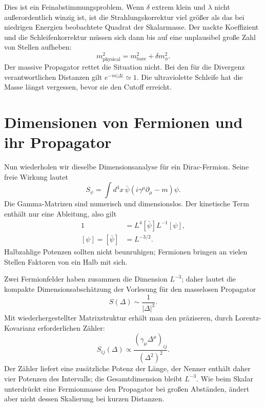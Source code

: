 Dies ist ein Feinabstimmungsproblem. Wenn \(\delta\) extrem klein und \(\lambda\) nicht außerordentlich winzig ist, ist die Strahlungskorrektur viel größer als das bei niedrigen Energien beobachtete Quadrat der Skalarmasse. Der nackte Koeffizient und die Schleifenkorrektur müssen sich dann bis auf eine unplausibel große Zahl von Stellen aufheben:
\begin{equation}
m_{\mathrm{physical}}^2
=m_{\mathrm{bare}}^2+\delta m_\phi^2.
\end{equation}
Der massive Propagator rettet die Situation nicht. Bei den für die Divergenz verantwortlichen Distanzen gilt \(e^{-m|\Delta|}\simeq1\). Die ultraviolette Schleife hat die Masse längst vergessen, bevor sie den Cutoff erreicht.

\section{Dimensionen von Fermionen und ihr Propagator}

Nun wiederholen wir dieselbe Dimensionsanalyse für ein Dirac-Fermion. Seine freie Wirkung lautet
\begin{equation}
S_\psi=\int d^4x\,
\bar\psi\left(i\gamma^\mu\partial_\mu-m\right)\psi.
\end{equation}
Die Gamma-Matrizen sind numerisch und dimensionslos. Der kinetische Term enthält nur eine Ableitung, also gilt
\begin{align}
1
&=L^4[\bar\psi]L^{-1}[\psi],\\
[\psi]=[\bar\psi]&=L^{-3/2}.
\end{align}
Halbzahlige Potenzen sollten nicht beunruhigen; Fermionen bringen an vielen Stellen Faktoren von ein Halb mit sich.

\begin{classroomqa}
\end{classroomqa}

Zwei Fermionfelder haben zusammen die Dimension \(L^{-3}\); daher lautet die kompakte Dimensionsabschätzung der Vorlesung für den masselosen Propagator
\begin{equation}
S(\Delta)\sim\frac{1}{|\Delta|^3}.
\end{equation}
Mit wiederhergestellter Matrixstruktur erhält man den präziseren, durch Lorentz-Kovarianz erforderlichen Zähler:
\begin{equation}
S_{ij}(\Delta)
\propto
\frac{\left(\gamma_\mu\Delta^\mu\right)_{ij}}
{\left(\Delta^2\right)^2}.
\end{equation}
Der Zähler liefert eine zusätzliche Potenz der Länge, der Nenner enthält daher vier Potenzen des Intervalls; die Gesamtdimension bleibt \(L^{-3}\). Wie beim Skalar unterdrückt eine Fermionmasse den Propagator bei großen Abständen, ändert aber nicht dessen Skalierung bei kurzen Distanzen.

